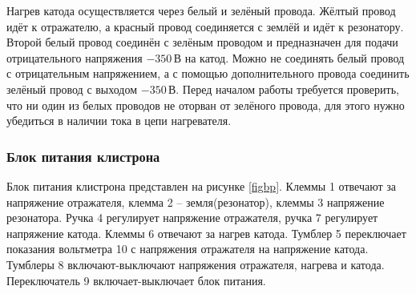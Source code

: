 \documentclass[a4paper,14pt]{extarticle}
\begin{document}
	Нагрев катода осуществляется через белый и зелёный провода. Жёлтый провод идёт к отражателю, а красный провод соединяется с землёй и идёт к резонатору. Второй белый провод соединён с зелёным проводом и предназначен для подачи отрицательного напряжения $-350\,$В на катод. Можно не соединять белый провод с отрицательным напряжением, а с помощью дополнительного провода соединить зелёный провод с выходом $-350\,$В. Перед началом работы требуется проверить, что ни один из белых проводов не оторван от зелёного провода, для этого нужно убедиться в наличии тока в цепи нагревателя. 
	
	\subsubsection{Блок питания клистрона}
	
	Блок питания клистрона представлен на рисунке \ref{figbp}. Клеммы 1 отвечают за напряжение отражателя, клемма 2 -- земля(резонатор), клеммы 3 напряжение резонатора. Ручка 4 регулирует напряжение отражателя, ручка 7 регулирует напряжение катода. Клеммы 6 отвечают за нагрев катода. Тумблер 5 переключает показания вольтметра 10 с напряжения отражателя на напряжение катода. Тумблеры 8 включают-выключают напряжения отражателя, нагрева и катода. Переключатель 9 включает-выключает блок питания.
	
\end{document}
